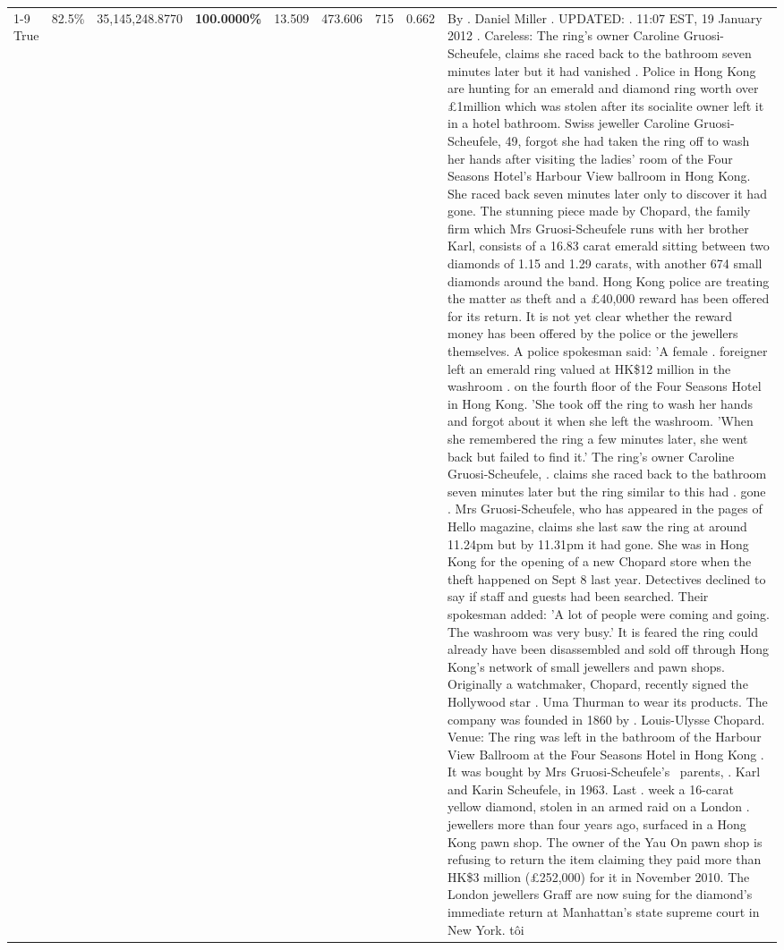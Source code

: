\begin{table}[H]
\begin{tabular}{lllrlllll}
\cline{1-9}
True & 82.5\% & 35,145,248.8770 & \bfseries \color{red} 100.0000\% & 13.509 & 473.606 & 715 & 0.662 & By . Daniel Miller . UPDATED: . 11:07 EST, 19 January 2012 . Careless: The ring's owner Caroline Gruosi-Scheufele, claims she raced back to the bathroom seven minutes later but it had vanished . Police in Hong Kong are hunting for an emerald and diamond ring worth over £1million which was stolen after its socialite owner left it in a hotel bathroom. Swiss jeweller Caroline Gruosi-Scheufele, 49, forgot she had taken the ring off to wash her hands after visiting the ladies' room of the Four Seasons Hotel's Harbour View ballroom in Hong Kong. She raced back seven minutes later only to discover it had gone. The stunning piece made by Chopard, the family firm which Mrs Gruosi-Scheufele runs with her brother Karl, consists of a 16.83 carat emerald sitting between two diamonds of 1.15 and 1.29 carats, with another 674 small diamonds around the band. Hong Kong police are treating the matter as theft and a £40,000 reward has been offered for its return. It is not yet clear whether the reward money has been offered by the police or the jewellers themselves. A police spokesman said: 'A female . foreigner left an emerald ring valued at HK\$12 million in the washroom . on the fourth floor of the Four Seasons Hotel in Hong Kong. 'She took off the ring to wash her hands and forgot about it when she left the washroom. 'When she remembered the ring a few minutes later, she went back but failed to find it.' The ring's owner Caroline Gruosi-Scheufele, . claims she raced back to the bathroom seven minutes later but the ring similar to this had . gone . Mrs Gruosi-Scheufele, who has appeared in the pages of Hello magazine, claims she last saw the ring at around 11.24pm but by 11.31pm it had gone. She was in Hong Kong for the opening of a new Chopard store when the theft happened on Sept 8 last year. Detectives declined to say if staff and guests had been searched. Their spokesman added: 'A lot of people were coming and going. The washroom was very busy.' It is feared the ring could already have been disassembled and sold off through Hong Kong's network of small jewellers and pawn shops. Originally a watchmaker, Chopard, recently signed the Hollywood star . Uma Thurman to wear its products. The company was founded in 1860 by . Louis-Ulysse Chopard. Venue: The ring was left in the bathroom of the Harbour View Ballroom at the Four Seasons Hotel in Hong Kong . It was bought by Mrs Gruosi-Scheufele's  parents, . Karl and Karin Scheufele, in 1963. Last . week a 16-carat yellow diamond, stolen in an armed raid on a London . jewellers more than four years ago, surfaced in a Hong Kong pawn shop. The owner of the Yau On pawn shop is refusing to return the item claiming they paid more than HK\$3 million (£252,000) for it in November 2010. The London jewellers Graff are now suing for the diamond’s immediate return at Manhattan’s state supreme court in New York. tôi \\

\end{tabular}
\end{table}
